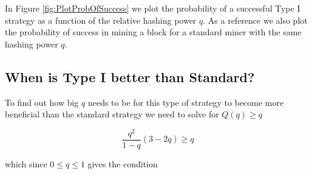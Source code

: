 \documentclass[letterpaper,12pt]{report}
\theoremstyle{plain}
\theoremstyle{definition}
\begin{document}
In Figure \ref{fig:PlotProbOfSuccess} we plot the probability of a successful Type I strategy as a function of the relative hashing power $q$. As a reference we also plot the probability of success in mining a block for a standard miner with the same hashing power $q$.

\noindent%
\begin{minipage}{\linewidth}
\label{fig:PlotProbOfSuccess}
\end{minipage}

\subsection{When is Type I better than Standard?}\label{TypeIoverStandard}
To find out how big $q$ needs to be for this type of strategy to become more beneficial than the standard strategy we need to solve for $Q(q)\geq q$

\begin{equation}\label{eq:type1overstandard}
\dfrac{q^2}{1-q}\left(3-2q\right) \geq q
\end{equation}

which since $0\leq q \leq 1$ gives the condition 
\end{document}
